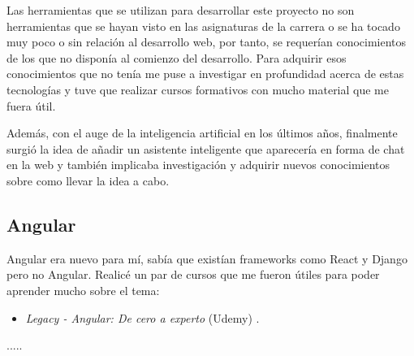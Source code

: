 Las herramientas que se utilizan para desarrollar este proyecto no son herramientas que se hayan visto en las asignaturas de la carrera o se ha tocado muy poco o sin relación al desarrollo web, por tanto, se requerían conocimientos de los que no disponía al comienzo del desarrollo. Para adquirir esos conocimientos que no tenía me puse a investigar en profundidad acerca de estas tecnologías y tuve que realizar cursos formativos con mucho material que me fuera útil.

Además, con el auge de la inteligencia artificial en los últimos años, finalmente surgió la idea de añadir un asistente inteligente que aparecería en forma de chat en la web y también implicaba investigación y adquirir nuevos conocimientos sobre como llevar la idea a cabo.

\subsection{Angular}

Angular era nuevo para mí, sabía que existían frameworks como React y Django pero no Angular. Realicé un par de cursos que me fueron útiles para poder aprender mucho sobre el tema:

\begin{itemize}
\tightlist
\item
  \emph{Legacy - Angular: De cero a experto} (Udemy)
  \cite{course:angular_legacy}.
\end{itemize}


.....